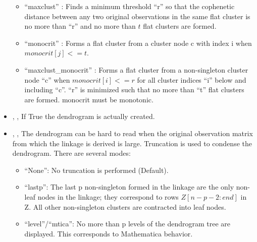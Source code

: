\begin{itemize}
\begin{itemize}
      \item   ``maxclust''         : Finds a minimum threshold ``r'' so that the cophenetic distance between any two original observations in the same flat cluster
                                     is no more than ``r'' and no more than $t$ flat clusters are formed.
      \item   ``monocrit''         : Forms a flat cluster from a cluster node c with index i when $monocrit[j] <= t$.
       \item  ``maxclust\_monocrit'' : Forms a flat cluster from a non-singleton cluster node ``c'' when $monocrit[i] <= r$ for all cluster indices ``i''
                                       below and including ``c''. ``r'' is minimized such that no more than ``t'' flat clusters are formed. monocrit must be
                                       monotonic.
    \end{itemize}
  \item {},     , If True the dendrogram is actually created.
  \item {}, , The dendrogram can be hard to read when the original observation matrix from which the
                                                                    linkage is derived is large. Truncation is used to condense the dendrogram. There are several
                                                                    modes:
                                                                    \begin{itemize}
                                                                      \item ``None'': No truncation is performed (Default).
                                                                      \item ``lastp'': The last p non-singleton formed in the linkage are the only non-leaf nodes
                                                                       in the linkage; they correspond to rows $Z[n-p-2:end]$ in Z. All other non-singleton
                                                                       clusters are contracted into leaf nodes.
                                                                      \item ``level''/``mtica'': No more than p levels of the dendrogram tree are displayed.
                                                                      This corresponds to Mathematica behavior.
                                                                    \end{itemize}

\end{itemize}
